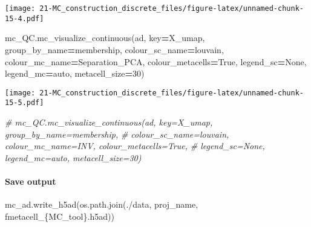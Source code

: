 \documentclass[
]{book}
\newenvironment{Shaded}{\begin{snugshade}}{\end{snugshade}}
\newcommand{\CommentTok}[1]{\textcolor[rgb]{0.56,0.35,0.01}{\textit{#1}}}
\newcommand{\DecValTok}[1]{\textcolor[rgb]{0.00,0.00,0.81}{#1}}
\newcommand{\NormalTok}[1]{#1}
\newcommand{\OperatorTok}[1]{\textcolor[rgb]{0.81,0.36,0.00}{\textbf{#1}}}
\newcommand{\SpecialCharTok}[1]{\textcolor[rgb]{0.00,0.00,0.00}{#1}}
\newcommand{\SpecialStringTok}[1]{\textcolor[rgb]{0.31,0.60,0.02}{#1}}
\newcommand{\StringTok}[1]{\textcolor[rgb]{0.31,0.60,0.02}{#1}}
\newcommand{\VariableTok}[1]{\textcolor[rgb]{0.00,0.00,0.00}{#1}}
\begin{document}
\texttt{[image: 21-MC\_construction\_discrete\_files/figure-latex/unnamed-chunk-15-4.pdf]}

\begin{Shaded}
\begin{Highlighting}[]
             
\NormalTok{mc\_QC.mc\_visualize\_continuous(ad, key}\OperatorTok{=}\StringTok{\textquotesingle{}X\_umap\textquotesingle{}}\NormalTok{, group\_by\_name}\OperatorTok{=}\StringTok{\textquotesingle{}membership\textquotesingle{}}\NormalTok{, }
\NormalTok{             colour\_sc\_name}\OperatorTok{=}\StringTok{\textquotesingle{}louvain\textquotesingle{}}\NormalTok{,  colour\_mc\_name}\OperatorTok{=}\StringTok{\textquotesingle{}Separation\_PCA\textquotesingle{}}\NormalTok{, colour\_metacells}\OperatorTok{=}\VariableTok{True}\NormalTok{, }
\NormalTok{             legend\_sc}\OperatorTok{=}\VariableTok{None}\NormalTok{, legend\_mc}\OperatorTok{=}\StringTok{\textquotesingle{}auto\textquotesingle{}}\NormalTok{, metacell\_size}\OperatorTok{=}\DecValTok{30}\NormalTok{)   }
\end{Highlighting}
\end{Shaded}

\texttt{[image: 21-MC\_construction\_discrete\_files/figure-latex/unnamed-chunk-15-5.pdf]}

\begin{Shaded}
\begin{Highlighting}[]
             
\CommentTok{\# mc\_QC.mc\_visualize\_continuous(ad, key=\textquotesingle{}X\_umap\textquotesingle{}, group\_by\_name=\textquotesingle{}membership\textquotesingle{},}
\CommentTok{\#              colour\_sc\_name=\textquotesingle{}louvain\textquotesingle{},  colour\_mc\_name=\textquotesingle{}INV\textquotesingle{}, colour\_metacells=True,}
\CommentTok{\#              legend\_sc=None, legend\_mc=\textquotesingle{}auto\textquotesingle{}, metacell\_size=30)}
\end{Highlighting}
\end{Shaded}

\hypertarget{save-output}{%
\paragraph*{Save output}\label{save-output}}

\begin{Shaded}
\begin{Highlighting}[]
\NormalTok{mc\_ad.write\_h5ad(os.path.join(}\StringTok{\textquotesingle{}./data\textquotesingle{}}\NormalTok{, proj\_name, }\SpecialStringTok{f\textquotesingle{}metacell\_}\SpecialCharTok{\{}\NormalTok{MC\_tool}\SpecialCharTok{\}}\SpecialStringTok{.h5ad\textquotesingle{}}\NormalTok{))}
\end{Highlighting}
\end{Shaded}
\end{document}
